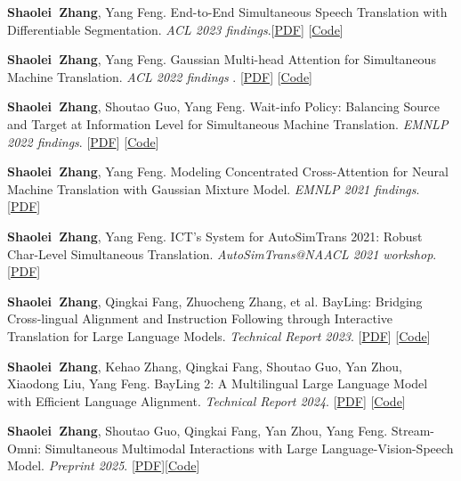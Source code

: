 \documentclass{resume}
\begin{document}
\begin{enumerate}[label={[\arabic*]},parsep=0ex]
    \item \textbf{Shaolei\ Zhang}, Yang Feng. End-to-End Simultaneous Speech Translation with Differentiable Segmentation. \textit{ACL 2023 findings}.[\href{https://aclanthology.org/2023.findings-acl.485.pdf}{PDF}] [\href{https://github.com/ictnlp/DiSeg}{Code}]

    \item \textbf{Shaolei\ Zhang}, Yang Feng. Gaussian Multi-head Attention for Simultaneous Machine Translation. \textit{ACL 2022 findings} . [\href{https://aclanthology.org/2022.findings-acl.238.pdf}{PDF}] [\href{https://github.com/ictnlp/GMA}{Code}]

    \item \textbf{Shaolei\ Zhang}, Shoutao Guo, Yang Feng. Wait-info Policy: Balancing Source and Target at Information Level for Simultaneous Machine Translation. \textit{EMNLP 2022 findings}. [\href{https://arxiv.org/pdf/2210.11220.pdf}{PDF}] [\href{https://github.com/ictnlp/Wait-info}{Code}]
    
    \item \textbf{Shaolei\ Zhang}, Yang Feng. Modeling Concentrated Cross-Attention for Neural Machine Translation with Gaussian Mixture Model. \textit{EMNLP 2021 findings}. [\href{https://aclanthology.org/2021.findings-emnlp.121.pdf}{PDF}]
    
    \item \textbf{Shaolei\ Zhang}, Yang Feng. ICT’s System for AutoSimTrans 2021: Robust Char-Level Simultaneous Translation. \textit{AutoSimTrans@NAACL 2021 workshop}. [\href{https://aclanthology.org/2021.autosimtrans-1.1.pdf}{PDF}]
    

    \item \textbf{Shaolei\ Zhang}, Qingkai Fang, Zhuocheng Zhang, et al. BayLing: Bridging Cross-lingual Alignment and Instruction Following through Interactive Translation for Large Language Models. \textit{Technical Report 2023}. [\href{https://arxiv.org/pdf/2306.10968.pdf}{PDF}] [\href{https://github.com/ictnlp/BayLing}{Code}]

    \item \textbf{Shaolei\ Zhang}, Kehao Zhang, Qingkai Fang, Shoutao Guo, Yan Zhou, Xiaodong Liu, Yang Feng. BayLing 2: A Multilingual Large Language Model with Efficient Language Alignment. \textit{Technical Report 2024}. [\href{https://arxiv.org/pdf/2411.16300}{PDF}] [\href{https://github.com/ictnlp/BayLing}{Code}]

    \item \textbf{Shaolei\ Zhang}, Shoutao Guo, Qingkai Fang, Yan Zhou, Yang Feng. Stream-Omni: Simultaneous Multimodal Interactions with Large Language-Vision-Speech Model. \textit{Preprint 2025}. [\href{https://arxiv.org/pdf/2506.13642?}{PDF}][\href{https://github.com/ictnlp/Stream-Omni}{Code}]


\end{enumerate}
\end{document}
